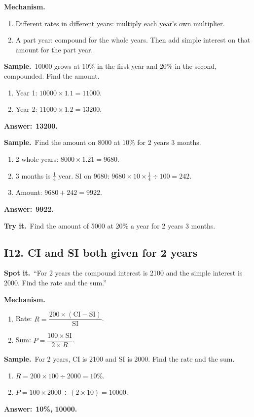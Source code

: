 \documentclass[11pt,a4paper]{article}
\let\oldsubsection\subsection
\renewcommand{\subsection}{\needspace{9\baselineskip}\oldsubsection}
\newcommand{\spot}{\textbf{\color{ember}Spot it.}\ }
\newcommand{\mech}{\textbf{\color{ember}Mechanism.}\ }
\newif\ifkeepsamp
\newcommand{\ans}[1]{\par\nopagebreak\noindent\textbf{\color{ember}Answer:}\ \textbf{#1}\par}
\newcommand{\samp}{\ifkeepsamp\needspace{4\baselineskip}\fi\textbf{\color{ember}Sample.}\ }
\newcommand{\tryit}[1]{\textbf{\color{ember}Try it.}\ #1}
\begin{document}
\mech
\begin{enumerate}
\item Different rates in different years: multiply each year's own multiplier.
\item A part year: compound for the whole years. Then add simple interest on that amount for the part year.
\end{enumerate}

\samp 10000 grows at 10\% in the first year and 20\% in the second, compounded. Find the amount.
\begin{enumerate}
\item Year 1: $10000 \times 1.1 = 11000$.
\item Year 2: $11000 \times 1.2 = 13200$.
\end{enumerate}
\ans{13200.}

\samp Find the amount on 8000 at 10\% for 2 years 3 months.
\begin{enumerate}
\item 2 whole years: $8000 \times 1.21 = 9680$.
\item 3 months is $\tfrac14$ year. SI on 9680: $9680 \times 10 \times \tfrac14 \div 100 = 242$.
\item Amount: $9680 + 242 = 9922$.
\end{enumerate}
\ans{9922.}

\tryit Find the amount of 5000 at 20\% a year for 2 years 3 months.

\subsection{I12. CI and SI both given for 2 years}
\spot ``For 2 years the compound interest is 2100 and the simple interest is 2000. Find the rate and the sum.''

\mech
\begin{enumerate}
\item Rate: $R = \dfrac{200 \times (\text{CI} - \text{SI})}{\text{SI}}$.
\item Sum: $P = \dfrac{100 \times \text{SI}}{2 \times R}$.
\end{enumerate}

\samp For 2 years, CI is 2100 and SI is 2000. Find the rate and the sum.
\begin{enumerate}
\item $R = 200 \times 100 \div 2000 = 10\%$.
\item $P = 100 \times 2000 \div (2 \times 10) = 10000$.
\end{enumerate}
\ans{10\%, 10000.}
\end{document}
